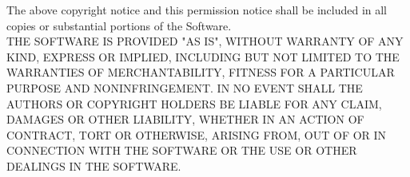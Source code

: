 \documentclass[a4paper,twoside, openright,12pt]{report}
\begin{document}
The above copyright notice and this permission notice shall be included in all copies or substantial portions of the Software.\\

THE SOFTWARE IS PROVIDED "AS IS", WITHOUT WARRANTY OF ANY KIND, EXPRESS OR IMPLIED, INCLUDING BUT NOT LIMITED TO THE WARRANTIES OF MERCHANTABILITY, FITNESS FOR A PARTICULAR PURPOSE AND NONINFRINGEMENT. IN NO EVENT SHALL THE AUTHORS OR COPYRIGHT HOLDERS BE LIABLE FOR ANY CLAIM, DAMAGES OR OTHER LIABILITY, WHETHER IN AN ACTION OF CONTRACT, TORT OR OTHERWISE, ARISING FROM, OUT OF OR IN CONNECTION WITH THE SOFTWARE OR THE USE OR OTHER DEALINGS IN THE SOFTWARE.
\end{document}
